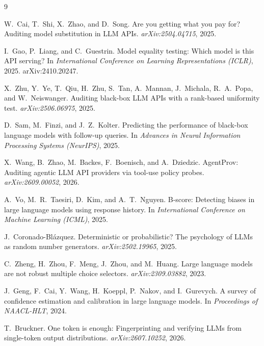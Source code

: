 \documentclass[10pt,twocolumn,letterpaper]{article}
\begin{document}
\begin{thebibliography}{9}
\setlength{\itemsep}{0.15em}

W.~Cai, T.~Shi, X.~Zhao, and D.~Song.
\newblock Are you getting what you pay for? Auditing model substitution in LLM APIs.
\newblock \emph{arXiv:2504.04715}, 2025.

I.~Gao, P.~Liang, and C.~Guestrin.
\newblock Model equality testing: Which model is this API serving?
\newblock In \emph{International Conference on Learning Representations (ICLR)}, 2025. arXiv:2410.20247.

X.~Zhu, Y.~Ye, T.~Qiu, H.~Zhu, S.~Tan, A.~Mannan, J.~Michala, R.~A.~Popa, and W.~Neiswanger.
\newblock Auditing black-box LLM APIs with a rank-based uniformity test.
\newblock \emph{arXiv:2506.06975}, 2025.

D.~Sam, M.~Finzi, and J.~Z.~Kolter.
\newblock Predicting the performance of black-box language models with follow-up queries.
\newblock In \emph{Advances in Neural Information Processing Systems (NeurIPS)}, 2025.

X.~Wang, B.~Zhao, M.~Backes, F.~Boenisch, and A.~Dziedzic.
\newblock AgentProv: Auditing agentic LLM API providers via tool-use policy probes.
\newblock \emph{arXiv:2609.00052}, 2026.

A.~Vo, M.~R.~Taesiri, D.~Kim, and A.~T.~Nguyen.
\newblock B-score: Detecting biases in large language models using response history.
\newblock In \emph{International Conference on Machine Learning (ICML)}, 2025.

J.~Coronado-Bl\'azquez.
\newblock Deterministic or probabilistic? The psychology of LLMs as random number generators.
\newblock \emph{arXiv:2502.19965}, 2025.

C.~Zheng, H.~Zhou, F.~Meng, J.~Zhou, and M.~Huang.
\newblock Large language models are not robust multiple choice selectors.
\newblock \emph{arXiv:2309.03882}, 2023.

J.~Geng, F.~Cai, Y.~Wang, H.~Koeppl, P.~Nakov, and I.~Gurevych.
\newblock A survey of confidence estimation and calibration in large language models.
\newblock In \emph{Proceedings of NAACL-HLT}, 2024.

T.~Bruckner.
\newblock One token is enough: Fingerprinting and verifying LLMs from single-token output distributions.
\newblock \emph{arXiv:2607.10252}, 2026.


\end{thebibliography}
\end{document}

